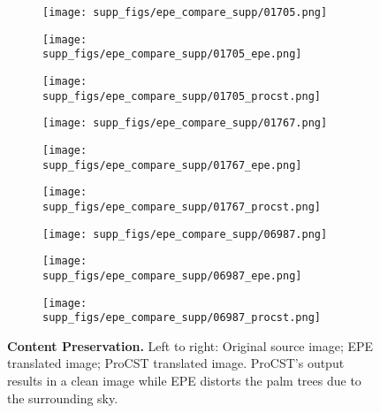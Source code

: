 \documentclass[letterpaper]{article} \usepackage[]{aaai23}  \usepackage{times}  \usepackage{helvet}  \usepackage{courier}  \usepackage[hyphens]{url}  \usepackage{graphicx} \urlstyle{rm} \def\UrlFont{\rm}  \usepackage{natbib}  \usepackage{caption} \frenchspacing  \setlength{\pdfpagewidth}{8.5in} \setlength{\pdfpageheight}{11in} \usepackage{algorithm}
\begin{document}
\begin{figure*}
    \centering
    \begin{subfigure}{0.32\linewidth}
        \centering
        \texttt{[image: supp\_figs/epe\_compare\_supp/01705.png]}
    \end{subfigure}
    \begin{subfigure}{0.32\linewidth}
        \centering
        \texttt{[image: supp\_figs/epe\_compare\_supp/01705\_epe.png]}
    \end{subfigure}
    \begin{subfigure}{0.32\linewidth}
        \centering
        \texttt{[image: supp\_figs/epe\_compare\_supp/01705\_procst.png]}
    \end{subfigure}
    
    \begin{subfigure}{0.32\linewidth}
        \centering
        \texttt{[image: supp\_figs/epe\_compare\_supp/01767.png]}
    \end{subfigure}
    \begin{subfigure}{0.32\linewidth}
        \centering
        \texttt{[image: supp\_figs/epe\_compare\_supp/01767\_epe.png]}
    \end{subfigure}
    \begin{subfigure}{0.32\linewidth}
        \centering
        \texttt{[image: supp\_figs/epe\_compare\_supp/01767\_procst.png]}
    \end{subfigure}
    \begin{subfigure}{0.32\linewidth}
        \centering
        \texttt{[image: supp\_figs/epe\_compare\_supp/06987.png]}
    \end{subfigure}
    \begin{subfigure}{0.32\linewidth}
        \centering
        \texttt{[image: supp\_figs/epe\_compare\_supp/06987\_epe.png]}
    \end{subfigure}
    \begin{subfigure}{0.32\linewidth}
        \centering
        \texttt{[image: supp\_figs/epe\_compare\_supp/06987\_procst.png]}
    \end{subfigure}
    \caption{\textbf{Content Preservation.} Left to right: Original source image; EPE translated image; ProCST translated image. ProCST's output results in a clean image while EPE \cite{richter2021enhancing} distorts the palm trees due to the surrounding sky.}
    \label{fig:epe_compare_sky}
\end{figure*}
\end{document}
